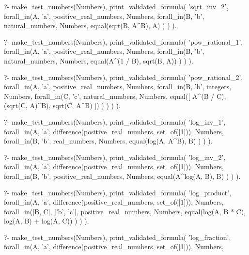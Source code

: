\begin{fact}
\begin{prolog}
?-	make_test_numbers(Numbers),
	print_validated_formula(
		'sqrt_inv_2',
		forall_in(A, 'a', positive_real_numbers, Numbers,
			forall_in(B, 'b', natural_numbers, Numbers,
				equal(sqrt(B, A^B), A)
			)
		)
	).				
\end{prolog}
\begin{prolog}
?-	make_test_numbers(Numbers),
	print_validated_formula(
		'pow_rational_1',
		forall_in(A, 'a', positive_real_numbers, Numbers,
			forall_in(B, 'b', natural_numbers, Numbers,
				equal(A^(1 / B), sqrt(B, A))
			)
		)
	).				
\end{prolog}
\begin{prolog}
?-	make_test_numbers(Numbers),
	print_validated_formula(
		'pow_rational_2',
		forall_in(A, 'a', positive_real_numbers, Numbers,
			forall_in(B, 'b', integers, Numbers,
				forall_in(C, 'c', natural_numbers, Numbers,
					equal([
						A^(B / C),
						(sqrt(C, A)^B),
						sqrt(C, A^B)
					])
				)
			)
		)
	).				
\end{prolog}
\begin{prolog}
?-	make_test_numbers(Numbers),
	print_validated_formula(
		'log_inv_1',
		forall_in(A, 'a', difference(positive_real_numbers, set_of([1])), Numbers,
			forall_in(B, 'b', real_numbers, Numbers,
				equal(log(A, A^B), B)
			)
		)
	).				
\end{prolog}
\begin{prolog}
?-	make_test_numbers(Numbers),
	print_validated_formula(
		'log_inv_2',
		forall_in(A, 'a', difference(positive_real_numbers, set_of([1])), Numbers,
			forall_in(B, 'b', positive_real_numbers, Numbers,
				equal(A^log(A, B), B)
			)
		)
	).				
\end{prolog}
\begin{prolog}
?-	make_test_numbers(Numbers),
	print_validated_formula(
		'log_product',
		forall_in(A, 'a', difference(positive_real_numbers, set_of([1])), Numbers,
			forall_in([B, C], ['b', 'c'], positive_real_numbers, Numbers,
				equal(log(A, B * C), log(A, B) + log(A, C))
			)
		)
	).				
\end{prolog}
\begin{prolog}
?-	make_test_numbers(Numbers),
	print_validated_formula(
		'log_fraction',
		forall_in(A, 'a', difference(positive_real_numbers, set_of([1])), Numbers,

\end{prolog}
\end{fact}
